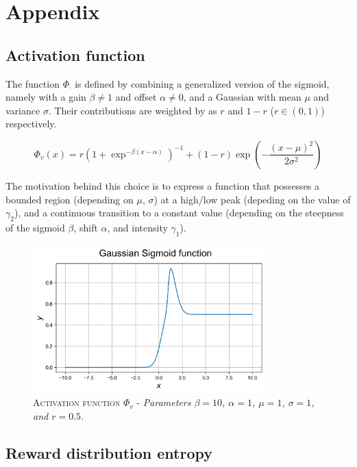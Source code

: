 
\section{Appendix}\label{sec:appendix}


\subsection{Activation function}
\noindent The function $\Phi_{\cdot}$ is defined by combining a generalized version of the sigmoid, namely with a gain $\beta \neq 1$ and offset $\alpha\neq 0$, and a Gaussian with mean $\mu$ and variance $\sigma$. Their contributions are weighted by as $r$ and $1-r$ ($r\in(0,1)$) respectively.

\begin{equation*}
    \Phi_v(x) = r\left(1 + \exp^{-\beta(x-\alpha)}\right)^{-1} + (1-r)\exp\left(-\frac{(x-\mu)^2}{2\sigma^2}\right)
\end{equation*}

\noindent The motivation behind this choice is to express a function that possesses a bounded region (depending on $\mu,\,\sigma$) at a high/low peak (depeding on the value of $\gamma_{2}$), and a continuous transition to a constant value (depending on the steepness of the sigmoid $\beta$, shift
$\alpha$, and intensity $\gamma_{1}$).

\begin{figure}[ht]
    \centering
    \includegraphics[width=0.8\textwidth]{figures/gaussian_sigmoid.png}
    \caption{\textsc{Activation function $\Phi_{v}$} - \textit{Parameters $\beta=10$, $\alpha=1$, $\mu=1$, $\sigma=1$, and $r=0.5$.}}
    \label{fig:gau_sigm}
\end{figure}


\subsection{Reward distribution entropy}\label{sec:appendix_entropy}

